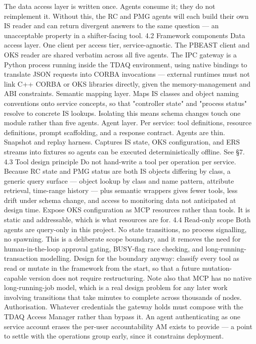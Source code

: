 The data access layer is written once. Agents consume it; they do not reimplement it. Without this, the RC and PMG agents will each build their own IS reader and can return divergent answers to the same question — an unacceptable property in a shifter-facing tool.
4.2 Framework components
Data access layer. One client per access tier, service-agnostic. The PBEAST client and OKS reader are shared verbatim across all five agents. The IPC gateway is a Python process running inside the TDAQ environment, using native bindings to translate JSON requests into CORBA invocations — external runtimes must not link C++ CORBA or OKS libraries directly, given the memory-management and ABI constraints.
Semantic mapping layer. Maps IS classes and object naming conventions onto service concepts, so that "controller state" and "process status" resolve to concrete IS lookups. Isolating this means schema changes touch one module rather than five agents.
Agent layer. Per service: tool definitions, resource definitions, prompt scaffolding, and a response contract. Agents are thin.
Snapshot and replay harness. Captures IS state, OKS configuration, and ERS streams into fixtures so agents can be executed deterministically offline. See §7.
4.3 Tool design principle
Do not hand-write a tool per operation per service. Because RC state and PMG status are both IS objects differing by class, a generic query surface — object lookup by class and name pattern, attribute retrieval, time-range history — plus semantic wrappers gives fewer tools, less drift under schema change, and access to monitoring data not anticipated at design time.
Expose OKS configuration as MCP resources rather than tools. It is static and addressable, which is what resources are for.
4.4 Read-only scope
Both agents are query-only in this project. No state transitions, no process signalling, no spawning. This is a deliberate scope boundary, and it removes the need for human-in-the-loop approval gating, BUSY-flag race checking, and long-running-transaction modelling.
Design for the boundary anyway: classify every tool as read or mutate in the framework from the start, so that a future mutation-capable version does not require restructuring. Note also that MCP has no native long-running-job model, which is a real design problem for any later work involving transitions that take minutes to complete across thousands of nodes.
Authorisation. Whatever credentials the gateway holds must compose with the TDAQ Access Manager rather than bypass it. An agent authenticating as one service account erases the per-user accountability AM exists to provide — a point to settle with the operations group early, since it constrains deployment.

